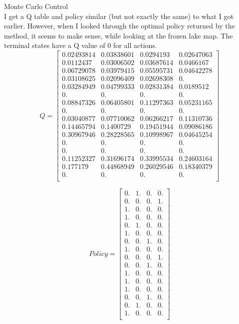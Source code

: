 \documentclass[12pt]{article}
\newenvironment{problem}[2][\large Problem]{\begin{trivlist}
\item[\hskip \labelsep {\bfseries #1}\hskip \labelsep {\bfseries #2.}]}{\end{trivlist}}
\begin{document}
\newpage
\begin{problem} {5} Monte Carlo Control\\

I get a Q table and policy similar (but not exactly the same) to what I got earlier. However, when I looked through the optimal policy returned by the method, it seems to make sense, while looking at the frozen lake map. The terminal states have a Q value of 0 for all actions.
$$ Q = \begin{bmatrix} 
 0.02493814 & 0.03838601 & 0.0294193  & 0.02647063\\
 0.0112437  & 0.03006502 & 0.03687614 & 0.0466167 \\
 0.06729078 & 0.03979415 & 0.05595731 & 0.04642278\\
 0.03108625 & 0.02096409 & 0.02698308 & 0.        \\
 0.03284949 & 0.04799333 & 0.02831384 & 0.0189512 \\
 0.         & 0.         & 0.         & 0.        \\
 0.08847326 & 0.06405801 & 0.11297363 & 0.05231165\\
 0.         & 0.         & 0.         & 0.        \\
 0.03040877 & 0.07710062 & 0.06266217 & 0.11310736\\
 0.14465794 & 0.1400729  & 0.19451944 & 0.09086186\\
 0.30967946 & 0.28228565 & 0.10998967 & 0.04645254\\
 0.         & 0.         & 0.         & 0.        \\
 0.         & 0.         & 0.         & 0.        \\
 0.11252327 & 0.31696174 & 0.33995534 & 0.24603164\\
 0.177179   & 0.44868949 & 0.26029546 & 0.18340379\\
 0.         & 0.         & 0.         & 0.        \\
\end{bmatrix}$$

$$ Policy = \begin{bmatrix} 
 0. & 1. & 0. & 0.\\
 0. & 0. & 0. & 1.\\
 1. & 0. & 0. & 0.\\
 1. & 0. & 0. & 0.\\
 0. & 1. & 0. & 0.\\
 1. & 0. & 0. & 0.\\
 0. & 0. & 1. & 0.\\
 1. & 0. & 0. & 0.\\
 0. & 0. & 0. & 1.\\
 0. & 0. & 1. & 0.\\
 1. & 0. & 0. & 0.\\
 1. & 0. & 0. & 0.\\
 1. & 0. & 0. & 0.\\
 0. & 0. & 1. & 0.\\
 0. & 1. & 0. & 0.\\
 1. & 0. & 0. & 0.\\
\end{bmatrix} $$ 

\end{problem}
\end{document}
